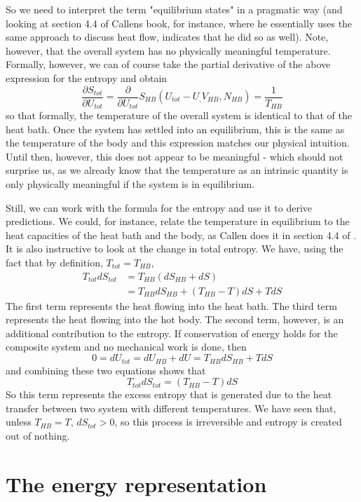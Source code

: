 \documentclass[a4paper, draft]{article}
\theoremstyle{own}
\theoremstyle{remark}
\begin{document}
So we need to interpret the term "equilibrium states" in a pragmatic way (and looking at section 4.4 of Callens book, for instance, where he essentially uses the same approach to discuss heat flow, indicates that he did so as well). Note, however, that the overall system has no physically meaningful temperature. Formally, however, we can of course take the partial derivative of the above expression for the entropy and obtain
$$
\frac{\partial S_{tot}}{\partial U_{tot}} = \frac{\partial}{\partial U_{tot}} S_{HB}(U_{tot} - U_, V_{HB}, N_{HB}) = \frac{1}{T_{HB}}
$$
so that formally, the temperature of the overall system is identical to that of the heat bath. Once the system has settled into an equilibrium, this is the same as the temperature of the body and this expression matches our physical intuition. Until then, however, this does not appear to be meaningful - which should not surprise us, as we already know that the temperature as an intrinsic quantity is only physically meaningful if the system is in equilibrium.

Still, we can work with the formula for the entropy and use it to derive predictions. We could, for instance, relate the temperature in equilibrium to the heat capacities of the heat bath and the body, as Callen does it in section 4.4 of \cite{Callen}. It is also instructive to look at the change in total entropy. We have, using the fact that by definition, $T_{tot} = T_{HB}$, 
\begin{align*}
T_{tot} dS_{tot} &= T_{HB} (dS_{HB} + dS)  \\
&= T_{HB} dS_{HB} + (T_{HB} - T) dS + T dS
\end{align*}
The first term represents the heat flowing into the heat bath. The third term represents the heat flowing into the hot body. The second term, however, is an additional contribution to the entropy. If conservation of energy holds for the composite system and no mechanical work is done, then
$$
0 = dU_{tot} = dU_{HB} + dU = T_{HB} dS_{HB}  + T dS
$$
and combining these two equations shows that
$$
T_{tot} dS_{tot} = (T_{HB} - T) dS
$$
So this term represents the excess entropy that is generated due to the heat transfer between two system with different temperatures. We have seen that, unless $T_{HB} = T$, $dS_{tot} > 0$, so this process is irreversible and entropy is created out of nothing.


\section{The energy representation}
\end{document}
